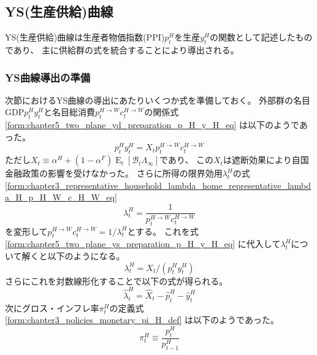 
\subsection{YS(生産供給)曲線}
\label{sec:chapter5_two_plane_ys}
YS(生産供給)曲線は生産者物価指数(PPI)\(p_t^H\)を生産\(y_t^H\)の関数として記述したものであり、
主に供給群の式を統合することにより導出される。

\subsubsection{YS曲線導出の準備}
\label{sec:chapter5_two_plane_ys_preparation}
次節におけるYS曲線の導出にあたりいくつか式を準備しておく。
外部群の名目GDP\(p_t^Hy_t^H\)と名目総消費\(p_t^{H\to W}c_t^{H\to W}\)の関係式
\eqref{form:chapter5_two_plane_yd_preparation_p_H_y_H_eq}
は以下のようであった。
\begin{equation}
\label{form:chapter5_two_plane_ys_preparation_p_H_y_H_eq}
    p_t^Hy_t^H=X_tp_t^{H\to W}c_t^{H\to W}
\end{equation}
ただし\(X_t\equiv\alpha^H+(1-\alpha^F)\operatorname{E}_t[\mathcal{B}_t\Lambda_{\infty}]\)であり、
この\(X_t\)は遮断効果により自国金融政策の影響を受けなかった。
さらに所得の限界効用\(\lambda_t^H\)の式
\eqref{form:chapter3_representative_household_lambda_home_representative_lambda_H_p_H_W_c_H_W_eq}
\begin{equation}
\label{form:chapter5_two_plane_ys_preparation_lambda_H_p_H_W_c_H_W_eq}
    \lambda_t^H=\frac{1}{p_t^{H\to W}c_t^{H\to W}}
\end{equation}
を変形して\(p_t^{H\to W}c_t^{H\to W}=1/\lambda_t^H\)とする。
これを式
\eqref{form:chapter5_two_plane_ys_preparation_p_H_y_H_eq}
に代入して\(\lambda_t^H\)について解くと以下のようになる。
\begin{equation}
\label{form:chapter5_two_plane_ys_preparation_lambda_H_p_H_y_H_eq}
    \lambda_t^H=X_t/(p_t^Hy_t^H)
\end{equation}
さらにこれを対数線形化することで以下の式が得られる。
\begin{equation}
\label{form:chapter5_two_plane_ys_preparation_lambda_H_p_H_y_H_modified_eq}
    \hat{\lambda}_t^H=\hat{X}_t-\hat{p}_t^H-\hat{y}_t^H
\end{equation}
次にグロス・インフレ率\(\pi_t^H\)の定義式
\eqref{form:chapter3_policies_monetary_pi_H_def}
は以下のようであった。
\begin{equation}
\label{form:chapter5_two_plane_ys_preparation_pi_H_def}
    \pi_t^H\equiv\frac{p_t^H}{p_{t-1}^H}
\end{equation}
